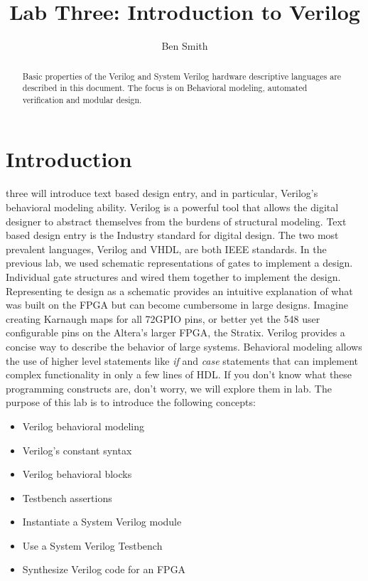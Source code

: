 \title{Lab Three: Introduction to Verilog}
\author{Ben Smith}




  \maketitle
    \begin{abstract}
      Basic properties of the Verilog and System Verilog hardware descriptive languages are described in this document. The focus is on Behavioral modeling, automated verification and modular design.
    \end{abstract}
  \section{Introduction}
     three will introduce text based design entry, and in particular, Verilog's behavioral modeling ability. Verilog is a powerful tool that allows the digital designer to abstract themselves from the burdens of structural modeling.  Text based design entry is the Industry standard for digital design. The two most prevalent languages, Verilog and VHDL, are both IEEE standards. In the previous lab,  we used schematic representations of gates to implement a design. Individual gate structures and wired them together to implement the design. Representing te design as a schematic provides an intuitive explanation of what was built on the FPGA but can become cumbersome in large designs. Imagine creating Karnaugh maps for all 72GPIO pins, or better yet the 548 user configurable pins on the Altera's larger FPGA, the Stratix\cite{Altera:StratixVDeviceOverview}. Verilog provides a concise way to describe the behavior of large systems. Behavioral modeling allows the use of higher level statements like {\it if} and {\it case} statements that can implement complex functionality in only a few lines of HDL. If you don't know what these programming constructs are, don't worry, we will explore them in lab. The purpose of this lab is to introduce the following concepts:
    \begin{itemize}
      \item Verilog behavioral modeling
      \item Verilog's constant syntax
      \item Verilog behavioral blocks
      \item Testbench assertions
      \item Instantiate a System Verilog module
      \item Use a System Verilog Testbench
      \item Synthesize Verilog code for an FPGA
    \end{itemize}
    
